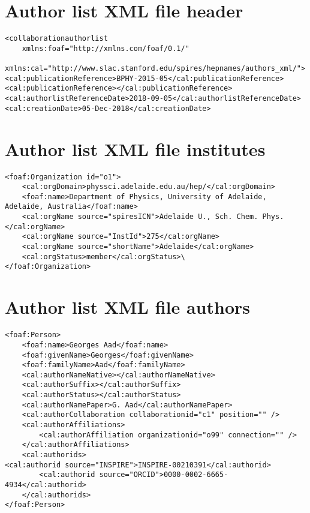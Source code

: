\section{Author list XML file header}%
\label{sec:author:xmlheader}

\begin{lstlisting}
<collaborationauthorlist
    xmlns:foaf="http://xmlns.com/foaf/0.1/"
    xmlns:cal="http://www.slac.stanford.edu/spires/hepnames/authors_xml/">
<cal:publicationReference>BPHY-2015-05</cal:publicationReference>
<cal:publicationReference></cal:publicationReference>
<cal:authorlistReferenceDate>2018-09-05</cal:authorlistReferenceDate>
<cal:creationDate>05-Dec-2018</cal:creationDate>

\end{lstlisting}

\section{Author list XML file institutes}%
\label{sec:author:xmlinstitute}

\begin{lstlisting}
<foaf:Organization id="o1">
    <cal:orgDomain>physsci.adelaide.edu.au/hep/</cal:orgDomain>
    <foaf:name>Department of Physics, University of Adelaide, Adelaide, Australia</foaf:name>
    <cal:orgName source="spiresICN">Adelaide U., Sch. Chem. Phys.</cal:orgName>
    <cal:orgName source="InstId">275</cal:orgName>
    <cal:orgName source="shortName">Adelaide</cal:orgName>
    <cal:orgStatus>member</cal:orgStatus>\
</foaf:Organization>

\end{lstlisting}

\section{Author list XML file authors}%
\label{sec:author:xmlauthor}

\begin{lstlisting}
<foaf:Person>
    <foaf:name>Georges Aad</foaf:name>
    <foaf:givenName>Georges</foaf:givenName>
    <foaf:familyName>Aad</foaf:familyName>
    <cal:authorNameNative></cal:authorNameNative>
    <cal:authorSuffix></cal:authorSuffix>
    <cal:authorStatus></cal:authorStatus>
    <cal:authorNamePaper>G. Aad</cal:authorNamePaper>
    <cal:authorCollaboration collaborationid="c1" position="" />
    <cal:authorAffiliations>
        <cal:authorAffiliation organizationid="o99" connection="" />
    </cal:authorAffiliations>
    <cal:authorids>
<cal:authorid source="INSPIRE">INSPIRE-00210391</cal:authorid>
        <cal:authorid source="ORCID">0000-0002-6665-4934</cal:authorid>
    </cal:authorids>
</foaf:Person>

\end{lstlisting}